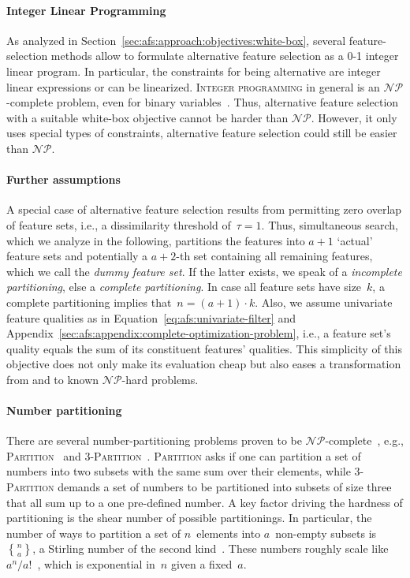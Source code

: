 \documentclass{article}
\theoremstyle{definition}
\newcommand{\stirling}[2]{\genfrac\{\}{0pt}{}{#1}{#2}} %
\begin{document}
\paragraph{Integer Linear Programming}

As analyzed in Section~\ref{sec:afs:approach:objectives:white-box}, several feature-selection methods allow to formulate alternative feature selection as a 0-1 integer linear program.
In particular, the constraints for being alternative are integer linear expressions or can be linearized.
\textsc{Integer programming} in general is an $\mathcal{NP}$-complete problem, even for binary variables~\cite{garey2003computers, karp1972reducibility}.
Thus, alternative feature selection with a suitable white-box objective cannot be harder than $\mathcal{NP}$.
However, it only uses special types of constraints, alternative feature selection could still be easier than $\mathcal{NP}$.

\paragraph{Further assumptions}

A special case of alternative feature selection results from permitting zero overlap of feature sets, i.e., a dissimilarity threshold of~$\tau = 1$.
Thus, simultaneous search, which we analyze in the following, partitions the features into $a+1$ `actual' feature sets and potentially a $a+2$-th set containing all remaining features, which we call the \emph{dummy feature set}.
If the latter exists, we speak of a \emph{incomplete partitioning}, else a \emph{complete partitioning}.
In case all feature sets have size~$k$, a complete partitioning implies that~$n = (a+1) \cdot k$.
Also, we assume univariate feature qualities as in Equation~\ref{eq:afs:univariate-filter} and Appendix~\ref{sec:afs:appendix:complete-optimization-problem}, i.e., a feature set's quality equals the sum of its constituent features' qualities.
This simplicity of this objective does not only make its evaluation cheap but also eases a transformation from and to known $\mathcal{NP}$-hard problems.

\paragraph{Number partitioning}

There are several number-partitioning problems proven to be $\mathcal{NP}$-complete~\cite{garey2003computers}, e.g., \textsc{Partition}~\cite{karp1972reducibility} and \textsc{3-Partition}~\cite{garey2003computers}.
\textsc{Partition} asks if one can partition a set of numbers into two subsets with the same sum over their elements, while \textsc{3-Partition} demands a set of numbers to be partitioned into subsets of size three that all sum up to a one pre-defined number.
A key factor driving the hardness of partitioning is the shear number of possible partitionings.
In particular, the number of ways to partition a set of $n$~elements into $a$~non-empty subsets is $\stirling{n}{a}$, a Stirling number of the second kind~\cite{graham1994concrete}.
These numbers roughly scale like $a^n / a!$~\cite{moser1958stirling}, which is exponential in~$n$ given a fixed~$a$.
\end{document}
